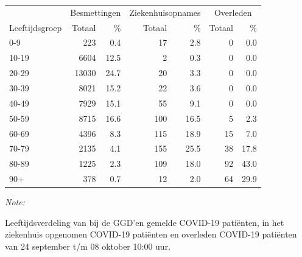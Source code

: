 \documentclass[
  english,
  man,floatsintext]{apa6}
\begin{document}
\begin{table}[H]
\centering\begingroup\fontsize{11}{13}\selectfont

\begin{threeparttable}
\begin{tabular}{lrrrrrr}
\toprule
\multicolumn{1}{c}{ } & \multicolumn{2}{c}{Besmettingen} & \multicolumn{2}{c}{Ziekenhuisopnames} & \multicolumn{2}{c}{Overleden} \\
\cmidrule(l{3pt}r{3pt}){2-3} \cmidrule(l{3pt}r{3pt}){4-5} \cmidrule(l{3pt}r{3pt}){6-7}
Leeftijdsgroep & Totaal & \% & Totaal & \% & Totaal & \%\\
\midrule
0-9 & 223 & 0.4 & 17 & 2.8 & 0 & 0.0\\
10-19 & 6604 & 12.5 & 2 & 0.3 & 0 & 0.0\\
20-29 & 13030 & 24.7 & 20 & 3.3 & 0 & 0.0\\
30-39 & 8021 & 15.2 & 22 & 3.6 & 0 & 0.0\\
40-49 & 7929 & 15.1 & 55 & 9.1 & 0 & 0.0\\
50-59 & 8715 & 16.6 & 100 & 16.5 & 5 & 2.3\\
60-69 & 4396 & 8.3 & 115 & 18.9 & 15 & 7.0\\
70-79 & 2135 & 4.1 & 155 & 25.5 & 38 & 17.8\\
80-89 & 1225 & 2.3 & 109 & 18.0 & 92 & 43.0\\
90+ & 378 & 0.7 & 12 & 2.0 & 64 & 29.9\\
\bottomrule
\end{tabular}
\begin{tablenotes}
\item \textit{Note: } 
\item Leeftijdsverdeling van bij de GGD’en gemelde COVID-19 patiënten, in het ziekenhuis opgenomen COVID-19 patiënten en overleden COVID-19 patiënten van 24 september t/m 08 oktober 10:00 uur.
\end{tablenotes}
\end{threeparttable}
\endgroup{}
\end{table}
\end{document}
